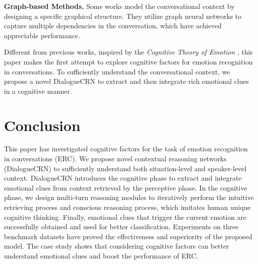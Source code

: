\documentclass[11pt,a4paper]{article}
\begin{document}
\textbf{Graph-based Methods.}
Some works \cite{DBLP:conf/ijcai/ZhangWSLZZ19,DBLP:conf/emnlp/GhosalMPCG19,DBLP:conf/emnlp/IshiwatariYMG20,DBLP:conf/interspeech/LianTL0YL20a} model the conversational context by designing a specific graphical structure.
They utilize graph neural networks \cite{DBLP:conf/iclr/KipfW17,DBLP:journals/corr/abs-1710-10903} to capture multiple dependencies in the conversation, which have achieved appreciable performance.

Different from previous works, inspired by the \textit{Cognitive Theory of Emotion} \cite{article1962,scherer2001appraisal}, this paper makes the first attempt to explore cognitive factors for emotion recognition in conversations. To sufficiently understand the conversational context, we propose a novel DialogueCRN to extract and then integrate rich emotional clues in a cognitive manner. 





\section{Conclusion}
This paper has investigated cognitive factors for the task of emotion recognition in conversations (ERC). We propose novel contextual reasoning networks (DialogueCRN) to sufficiently understand both situation-level and speaker-level context. 
DialogueCRN introduces the cognitive phase to extract and integrate emotional clues from context retrieved by the perceptive phase.
In the cognitive phase, we design multi-turn reasoning modules to iteratively perform the intuitive retrieving process and conscious reasoning process, which imitates human unique cognitive thinking. 
Finally, emotional clues that trigger the current emotion are successfully obtained and used for better classification.
Experiments on three benchmark datasets have proved the effectiveness and superiority of the proposed model. 
The case study shows that considering cognitive factors can better understand emotional clues and boost the performance of ERC.
\end{document}
